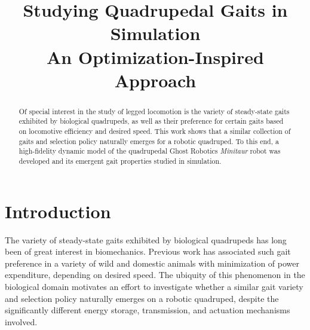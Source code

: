 \documentclass[conference,11pt,letterpaper]{IEEEtran}
\begin{document}
%
\title{\LARGE Studying Quadrupedal Gaits in Simulation\\\Large An Optimization-Inspired Approach}

\author{
}

\maketitle

\begin{abstract}

Of special interest in the study of legged locomotion is the variety of steady-state gaits exhibited by biological quadrupeds, as well as their preference for certain gaits based on locomotive efficiency and desired speed. This work shows that a similar collection of gaits and selection policy naturally emerges for a robotic quadruped. To this end, a high-fidelity dynamic model of the quadrupedal Ghost Robotics \emph{Minitaur} robot was developed and its emergent gait properties studied in simulation.
\end{abstract}

\section{Introduction}


The variety of steady-state gaits exhibited by biological quadrupeds has long been of great interest in biomechanics. Previous work \autocite{hoyt_taylor_1981,hegland_taylor_1988} has associated such gait preference in a variety of wild and domestic animals with minimization of power expenditure, depending on desired speed. The ubiquity of this phenomenon in the biological domain motivates an effort to investigate whether a similar gait variety and selection policy naturally emerges on a robotic quadruped, despite the significantly different energy storage, transmission, and actuation mechanisms involved.
\end{document}
